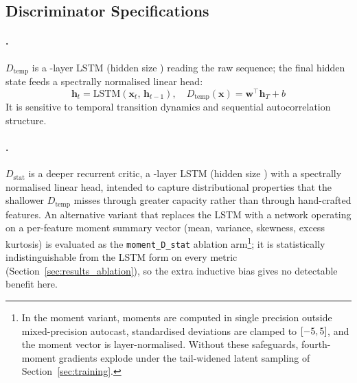 \documentclass[preprint,12pt]{elsarticle}
\makeatletter
\let\ElsParagraph\paragraph
\def\StripRunInStop#1.\StripRunInMark#2\StripRunInEnd{#1}
\let\StripRunInMark\@empty
\renewcommand\paragraph[1]{\ElsParagraph{\StripRunInStop#1\StripRunInMark.\StripRunInMark\StripRunInEnd}}
\newcommand{\Dtemp}{D_{\mathrm{temp}}}
\newcommand{\Dstat}{D_{\mathrm{stat}}}
\makeatother
\begin{document}
\subsection{Discriminator Specifications}
\label{sec:discriminators}

\paragraph{$\Dtemp$: Temporal Discriminator.}
$\Dtemp$ is a \codeDTempLayers-layer LSTM (hidden size \codeDTempHidden)
reading the raw sequence;
the final hidden state feeds a spectrally normalised linear head:
\begin{equation}
  \mathbf{h}_t = \mathrm{LSTM}\!\left(\mathbf{x}_t,\, \mathbf{h}_{t-1}\right),
  \quad
  \Dtemp(\mathbf{x}) = \mathbf{w}^\top \mathbf{h}_T + b
  \label{eq:dtemp}
\end{equation}
It is sensitive to temporal transition dynamics and sequential
autocorrelation structure.

\paragraph{$\Dstat$: Statistical Fidelity Discriminator.}
$\Dstat$ is a deeper recurrent critic, a \codeDStatLayers-layer LSTM (hidden size
\codeDStatHidden) with a spectrally normalised linear head, intended to capture
distributional properties that the shallower $\Dtemp$ misses through
greater capacity rather than through hand-crafted features.  An
alternative variant that replaces the LSTM with a network operating on a
per-feature moment summary vector (mean, variance, skewness, excess
kurtosis) is evaluated as the \texttt{moment\_D\_stat} ablation
arm\footnote{In the moment variant, moments are computed in single
precision outside mixed-precision autocast, standardised deviations are
clamped to $[-5, 5]$, and the moment
vector is layer-normalised.
Without these safeguards, fourth-moment gradients explode under the
tail-widened latent sampling of Section~\ref{sec:training}.}; it is
statistically indistinguishable from the LSTM form on every metric
(Section~\ref{sec:results_ablation}), so the extra inductive bias gives
no detectable benefit here.
\end{document}
